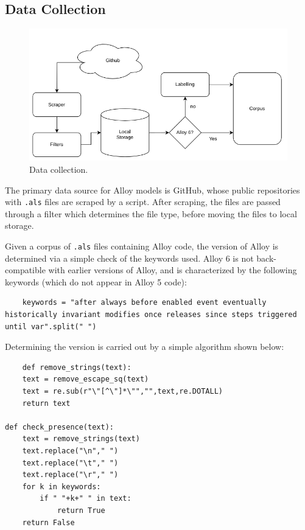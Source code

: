 \documentclass[conference]{IEEEtran}
\begin{document}
\subsection{Data Collection}

\begin{figure}[htbp]
    \centerline{\includegraphics[width=\linewidth]{"./images/scraping.png"}}
    \caption{Data collection.}
    \label{fig}
    \end{figure}

The primary data source for Alloy models is GitHub, whose public repositories with \verb|.als| files are scraped by a script. After scraping, the files are passed through a filter which determines the file type, before moving the files to local storage.

Given a corpus of \verb|.als| files containing Alloy code, the version of Alloy is determined via a simple check of the keywords used. Alloy 6 is not back-compatible with earlier versions of Alloy, and is characterized by the following keywords (which do not appear in Alloy 5 code):

\begin{lstlisting}
    keywords = "after always before enabled event eventually historically invariant modifies once releases since steps triggered until var".split(" ")
\end{lstlisting}

Determining the version is carried out by a simple algorithm shown below:

\begin{lstlisting}
    def remove_strings(text):
	text = remove_escape_sq(text)
	text = re.sub(r"\"[^\"]*\"","",text,re.DOTALL)
	return text

def check_presence(text):
	text = remove_strings(text)
	text.replace("\n"," ")
	text.replace("\t"," ")
	text.replace("\r"," ")
	for k in keywords:
		if " "+k+" " in text:
			return True
	return False
\end{lstlisting}
\end{document}
